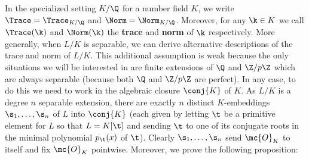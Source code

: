    In the specialized setting $K/\Q$ for a number field $K$, we write $\Trace = \Trace_{K/\Q}$ and $\Norm = \Norm_{K/\Q}$. Moreover, for any $\k \in K$ we call $\Trace(\k)$ and $\Norm(\k)$ the \textbf{trace} and \textbf{norm} of $\k$ respectively. More generally, when $L/K$ is separable, we can derive alternative descriptions of the trace and norm of $L/K$. This additional assumption is weak because the only situations we will be interested in are finite extensions of $\Q$ and $\Z/p\Z$ which are always separable (because both $\Q$ and $\Z/p\Z$ are perfect). In any case, to do this we need to work in the algebraic closure $\conj{K}$ of $K$. As $L/K$ is a degree $n$ separable extension, there are exactly $n$ distinct $K$-embeddings $\s_{1},\ldots,\s_{n}$ of $L$ into $\conj{K}$ (each given by letting $\t$ be a primitive element for $L$ so that $L = K[\t]$ and sending $\t$ to one of its conjugate roots in the minimal polynomial $p_{\t}(x)$ of $\t$). Clearly $\s_{1},\ldots,\s_{n}$ send $\mc{O}_{K}$ to itself and fix $\mc{O}_{K}$ pointwise. Moreover, we prove the following proposition:

